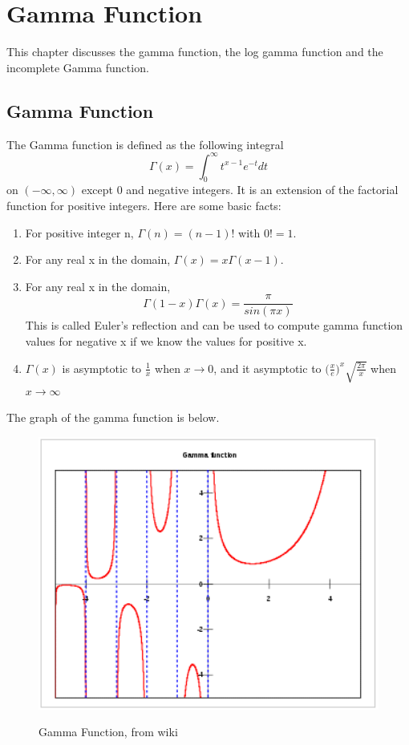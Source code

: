 \chapter{Gamma Function}
\minitoc
This chapter discusses the gamma function, the log gamma function and the incomplete Gamma function. 

\section{Gamma Function}
The Gamma function is defined as the following integral
\[ \Gamma(x) = \int_0^\infty t^{x-1} e^{-t}dt\]
on $(-\infty, \infty)$ except 0 and negative integers. It is an extension of the factorial function for positive integers.
Here are some basic facts:
\begin{enumerate}
\item For positive integer n, $\Gamma(n) = (n-1)!$ with $0! = 1$.
\item For any real x in the domain, $\Gamma(x) = x\Gamma(x-1)$.
\item For any real x in the domain, 
\[\Gamma(1 - x)\Gamma(x) = \frac{\pi}{sin(\pi x)}\] 
This is called Euler's reflection and can be used to compute gamma function values for negative x if we know the values for positive x.
\item $\Gamma(x)$ is asymptotic to $\frac{1}{x}$ when $x \rightarrow 0$, and it asymptotic to $\Big(\frac{x}{e}\Big)^x \sqrt{\frac{2\pi}{x}}$  when $x \rightarrow \infty$ 
\end{enumerate} 
The graph of the gamma function is below. 
\begin{figure}[htp]
\begin{center}
{
\includegraphics[bb=-90 0 400 250,width=1\textwidth] {chap3/gamma.png}
}
\end{center}
\caption{Gamma Function, from wiki}
\label{figure:gammafunction}
\end{figure}

